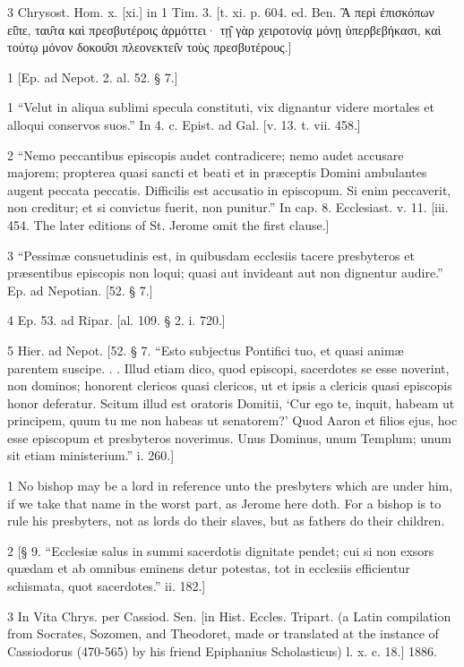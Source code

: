 3
Chrysost. Hom. x. [xi.] in 1 Tim. 3. [t. xi. p. 604. ed. Ben. Ἃ περὶ ἐπισκόπων εἰ̑πε, ταυ̑τα καὶ πρεσβυτέροις ἁρμόττει· τῃ̑ γὰρ χειροτονίᾳ μόνῃ ὑπερβεβήκασι, καὶ τούτῳ μόνον δοκου̑σι πλεονεκτει̑ν τοὺς πρεσβυτέρους.]

1
[Ep. ad Nepot. 2. al. 52. § 7.]

1
“Velut in aliqua sublimi specula constituti, vix dignantur videre mortales et alloqui conservos suos.” In 4. c. Epist. ad Gal. [v. 13. t. vii. 458.]

2
“Nemo peccantibus episcopis audet contradicere; nemo audet accusare majorem; propterea quasi sancti et beati et in præceptis Domini ambulantes augent peccata peccatis. Difficilis est accusatio in episcopum. Si enim peccaverit, non creditur; et si convictus fuerit, non punitur.” In cap. 8. Ecclesiast. v. 11. [iii. 454. The later editions of St. Jerome omit the first clause.]

3
“Pessimæ consuetudinis est, in quibusdam ecclesiis tacere presbyteros et præsentibus episcopis non loqui; quasi aut invideant aut non dignentur audire.” Ep. ad Nepotian. [52. § 7.]

4
Ep. 53. ad Ripar. [al. 109. § 2. i. 720.]

5
Hier. ad Nepot. [52. § 7. “Esto subjectus Pontifici tuo, et quasi animæ parentem suscipe. . . Illud etiam dico, quod episcopi, sacerdotes se esse noverint, non dominos; honorent clericos quasi clericos, ut et ipsis a clericis quasi episcopis honor deferatur. Scitum illud est oratoris Domitii, ‘Cur ego te, inquit, habeam ut principem, quum tu me non habeas ut senatorem?’ Quod Aaron et filios ejus, hoc esse episcopum et presbyteros noverimus. Unus Dominus, unum Templum; unum sit etiam ministerium.” i. 260.]

1
No bishop may be a lord in reference unto the presbyters which are under him, if we take that name in the worst part, as Jerome here doth. For a bishop is to rule his presbyters, not as lords do their slaves, but as fathers do their children.

2
[§ 9. “Ecclesiæ salus in summi sacerdotis dignitate pendet; cui si non exsors quædam et ab omnibus eminens detur potestas, tot in ecclesiis efficientur schismata, quot sacerdotes.” ii. 182.]

3
In Vita Chrys. per Cassiod. Sen. [in Hist. Eccles. Tripart. (a Latin compilation from Socrates, Sozomen, and Theodoret, made or translated at the instance of Cassiodorus (470-565) by his friend Epiphanius Scholasticus) l. x. c. 18.] 1886.

